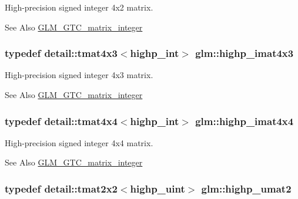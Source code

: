 High-\/precision signed integer 4x2 matrix. 

\begin{DoxySeeAlso}{See Also}
\hyperlink{group__gtc__matrix__integer}{G\-L\-M\-\_\-\-G\-T\-C\-\_\-matrix\-\_\-integer} 
\end{DoxySeeAlso}
\hypertarget{group__gtc__matrix__integer_gaf644a447ba64f23d2245f0a3cac9cc74}{
\subsubsection[{highp\-\_\-imat4x3}]{\setlength{\rightskip}{0pt plus 5cm}typedef detail\-::tmat4x3$<$highp\-\_\-int$>$ {\bf glm\-::highp\-\_\-imat4x3}}}\label{group__gtc__matrix__integer_gaf644a447ba64f23d2245f0a3cac9cc74}


High-\/precision signed integer 4x3 matrix. 

\begin{DoxySeeAlso}{See Also}
\hyperlink{group__gtc__matrix__integer}{G\-L\-M\-\_\-\-G\-T\-C\-\_\-matrix\-\_\-integer} 
\end{DoxySeeAlso}
\hypertarget{group__gtc__matrix__integer_gaff23c95b5feea2b2352b377810783823}{
\subsubsection[{highp\-\_\-imat4x4}]{\setlength{\rightskip}{0pt plus 5cm}typedef detail\-::tmat4x4$<$highp\-\_\-int$>$ {\bf glm\-::highp\-\_\-imat4x4}}}\label{group__gtc__matrix__integer_gaff23c95b5feea2b2352b377810783823}


High-\/precision signed integer 4x4 matrix. 

\begin{DoxySeeAlso}{See Also}
\hyperlink{group__gtc__matrix__integer}{G\-L\-M\-\_\-\-G\-T\-C\-\_\-matrix\-\_\-integer} 
\end{DoxySeeAlso}
\hypertarget{group__gtc__matrix__integer_ga65158bd3fa138afe2c389a8e50e22c27}{
\subsubsection[{highp\-\_\-umat2}]{\setlength{\rightskip}{0pt plus 5cm}typedef detail\-::tmat2x2$<$highp\-\_\-uint$>$ {\bf glm\-::highp\-\_\-umat2}}}\label{group__gtc__matrix__integer_ga65158bd3fa138afe2c389a8e50e22c27}


